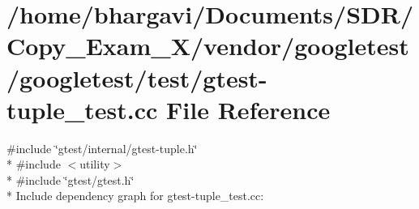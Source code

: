 \hypertarget{gtest-tuple__test_8cc}{}\section{/home/bhargavi/\+Documents/\+S\+D\+R/\+Copy\+\_\+\+Exam\+\_\+X/vendor/googletest/googletest/test/gtest-\/tuple\+\_\+test.cc File Reference}
\label{gtest-tuple__test_8cc}
{\ttfamily \#include \char`\"{}gtest/internal/gtest-\/tuple.\+h\char`\"{}}\\*
{\ttfamily \#include $<$utility$>$}\\*
{\ttfamily \#include \char`\"{}gtest/gtest.\+h\char`\"{}}\\*
Include dependency graph for gtest-\/tuple\+\_\+test.cc\+:
